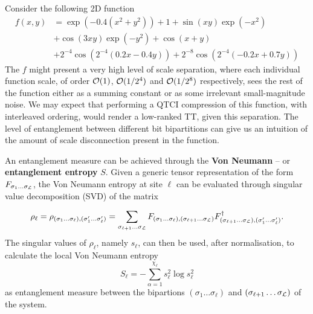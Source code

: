 \begin{example}
	Consider the following 2D function 
	\begin{equation}
		\begin{aligned}
		f(x,y) &= \exp(-0.4(x^2 + y^2)) + 1 + \sin(xy)\exp(-x^2)\\
		&+ \cos(3xy)\exp(-y^2) + \cos(x + y)\\ 
		&+2^{-4}\cos(2^{-4}(0.2x - 0.4y))+
          2^{-8}\cos(2^{-4}(-0.2x + 0.7y))
		\end{aligned}
		\label{eq:scaleSepFunc}
	\end{equation}
	The $f$ might present a very high level of scale separation, where each individual function scale, of order $\mathcal{O}(1)$, $\mathcal{O}(1/2^4)$ and $\mathcal{O}(1/2^8)$ respectively, sees the rest of the function either as a summing constant or as some irrelevant small-magnitude noise. We may expect that performing a QTCI compression of this function, with interleaved ordering, would render a low-ranked TT, given this separation. The level of entanglement between different bit bipartitions can give us an intuition of the amount of scale disconnection present in the function. 
	
	An entanglement measure can be achieved through the \textbf{Von Neumann} -- or \textbf{entanglement entropy} $S$. Given a generic tensor representation of the form $F_{\sigma_1\dots\sigma_{\mathcal{L}}}$, the Von Neumann entropy at site $\ell$ can be evaluated through singular value decomposition (SVD) of the matrix 
	
	\begin{equation}\rho_\ell = \rho_{(\sigma_1\dots\sigma_\ell),(\sigma'_1\dots\sigma'_\ell)} = \sum_{\sigma_{\ell +1}\dots\sigma_{\mathcal{L}}}F_{(\sigma_1\dots\sigma_\ell),(\sigma_{\ell+1}\dots\sigma_{\mathcal{L}})}F^\dag_{(\sigma_{\ell+1}\dots\sigma_{\mathcal{L}}),(\sigma'_1\dots\sigma'_\ell)}.\end{equation}
	The  singular values of $\rho_\ell$, namely $s_\ell$, can then be used, after normalisation, to calculate the local Von Neumann entropy 
	\begin{equation}
		S_\ell = - \sum_{\alpha=1}^{\chi_\ell} s_\ell^2 \log s_\ell^2
	\end{equation}
	as entanglement measure between the bipartions $(\sigma_1\dots\sigma_\ell)$ and $(\sigma_{\ell+1}\dots\sigma_{\mathcal{L}})$ of the system.
	

\end{example}
